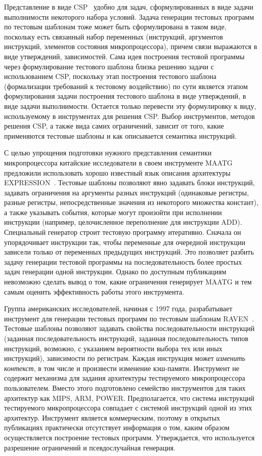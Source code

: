 Представление в виде CSP~\cite{CSP} удобно для задач,
сформулированных в виде задачи выполнимости некоторого набора
условий. Задача генерации тестовых программ по тестовым шаблонам
тоже может быть сформулирована в таком виде, поскольку есть
связанный набор переменных (инструкций, аргументов инструкций,
элементов состояния микропроцессора), причем связи выражаются в виде
утверждений, зависимостей. Сама идея построения тестовой программы
через формулирование тестового шаблона близка решению задачи с
использованием CSP, поскольку этап построения тестового шаблона
(формализации требований к тестовому воздействию) по сути является
этапом формулирования задачи построения тестового шаблона в виде
утверждений, в виде задачи выполнимости. Остается только перевести
эту формулировку к виду, используемому в инструментах для решения
CSP. Выбор инструментов, методов решения CSP, а также вида самих
ограничений, зависит от того, какие применяются тестовые шаблоны и
как описывается семантика инструкций.

С целью упрощения подготовки нужного представления семантики
микропроцессора китайские исследователи в своем инструменте
\textsc{MAATG}~\cite{MAATG} предложили использовать хорошо известный
язык описания архитектуры EXPRESSION~\cite{EXPRESSION}. Тестовые
шаблоны позволяют явно задавать блоки инструкций, задавать
ограничения на аргументы разных инструкций (одинаковые регистры,
разные регистры, непосредственные значения из некоторого множества
констант), а также указывать события, которые могут произойти при
исполнении инструкции (например, целочисленное переполнение для
инструкции ADD). Специальный генератор строит тестовую программу
итеративно. Сначала он упорядочивает инструкции так, чтобы
переменные для очередной инструкции зависели только от переменных
предыдущих инструкций. Это позволяет разбить задачу генерации
тестовой программы на последовательность более простых задач
генерации одной инструкции. Однако по доступным публикациям
невозможно сделать вывод о том, какие ограничения генерирует MAATG и
тем самым оценить эффективность работы этого инструмента.

Группа американских исследователей, начиная с 1997 года,
разрабатывает инструмент для генерации тестовых программ по тестовым
шаблонам \textsc{RAVEN}~\cite{RAVEN}. Тестовые шаблоны позволяют
задавать свойства последовательности инструкций (заданная
последовательность инструкций, заданная последовательность типов
инструкций, возможно, с указанием вероятности выбора тех или иных
инструкций), зависимости по регистрам. Каждая инструкция может
\emph{изменить контекст}, в том числе и произвести изменение
кэш-памяти. Инструмент не содержит механизма для задания архитектуры
тестируемого микропроцессора пользователем. Вместо этого
подготовлено семейство инструментов для таких архитектур как MIPS,
ARM, POWER. Предполагается, что система инструкций тестируемого
микропроцессора совпадает с системой инструкций одной из этих
архитектур. Инструмент является коммерческим, поэтому в открытых
публикациях практически отсутствует информация о том, каким образом
осуществляется построение тестовых программ. Утверждается, что
используется разрешение ограничений и псевдослучайная генерация.

